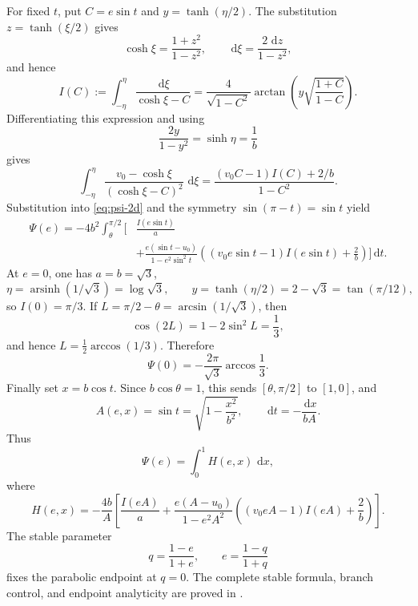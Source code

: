 \documentclass[11pt]{article}
\numberwithin{equation}{section}
\theoremstyle{remark}
\newcommand{\dd}{\,\mathrm d}
\newcommand{\arsinh}{\operatorname{arsinh}}
\begin{document}
For fixed \(t\), put \(C=e\sin t\) and \(y=\tanh(\eta/2)\).  The substitution \(z=\tanh(\xi/2)\) gives
\[
  \cosh\xi=\frac{1+z^2}{1-z^2},
  \qquad
  \dd\xi=\frac{2\,\dd z}{1-z^2},
\]
and hence
\begin{equation}
  I(C):=\int_{-\eta}^{\eta}\frac{\dd\xi}{\cosh\xi-C}
  =\frac4{\sqrt{1-C^2}}
  \arctan\left(y\sqrt{\frac{1+C}{1-C}}\right).
  \label{eq:I}
\end{equation}
Differentiating this expression and using
\[
  \frac{2y}{1-y^2}=\sinh\eta=\frac1b
\]
gives
\begin{equation}
  \int_{-\eta}^{\eta}
  \frac{v_0-\cosh\xi}{(\cosh\xi-C)^2}\,\dd\xi
  =\frac{(v_0C-1)I(C)+2/b}{1-C^2}.
  \label{eq:xi-second-integral}
\end{equation}
Substitution into \eqref{eq:psi-2d} and the symmetry \(\sin(\pi-t)=\sin t\) yield
\begin{equation}
\begin{aligned}
  \Psi(e)=-4b^2\int_\theta^{\pi/2}
  \bigg[&\frac{I(e\sin t)}a\\
  &+\frac{e(\sin t-u_0)}{1-e^2\sin^2t}
  \left((v_0e\sin t-1)I(e\sin t)+\frac2b\right)
  \bigg]\dd t.
\end{aligned}
\label{eq:psi-1d}
\end{equation}
At \(e=0\), one has \(a=b=\sqrt3\),
\[
  \eta=\arsinh(1/\sqrt3)=\log\sqrt3,
  \qquad
  y=\tanh(\eta/2)=2-\sqrt3=\tan(\pi/12),
\]
so \(I(0)=\pi/3\).  If \(L=\pi/2-\theta=\arcsin(1/\sqrt3)\), then
\[
  \cos(2L)=1-2\sin^2L=\frac13,
\]
and hence \(L=\frac12\arccos(1/3)\).  Therefore
\begin{equation}
  \Psi(0)=-\frac{2\pi}{\sqrt3}\arccos\frac13.
  \label{eq:psi-zero}
\end{equation}
Finally set \(x=b\cos t\).  Since \(b\cos\theta=1\), this sends \([\theta,\pi/2]\) to \([1,0]\), and
\[
  A(e,x)=\sin t=\sqrt{1-\frac{x^2}{b^2}},
  \qquad
  \dd t=-\frac{\dd x}{bA}.
\]
Thus
\begin{equation}
  \Psi(e)=\int_0^1H(e,x)\,\dd x,
  \label{eq:fixed-H}
\end{equation}
where
\begin{equation}
H(e,x)=-\frac{4b}{A}
\left[
\frac{I(eA)}a
+\frac{e(A-u_0)}{1-e^2A^2}
\left((v_0eA-1)I(eA)+\frac2b\right)
\right].
\label{eq:fixed-H-explicit}
\end{equation}
The stable parameter
\begin{equation}
  q=\frac{1-e}{1+e},
  \qquad e=\frac{1-q}{1+q}
  \label{eq:q}
\end{equation}
fixes the parabolic endpoint at \(q=0\).  The complete stable formula, branch control, and endpoint analyticity are proved in .
\end{document}
